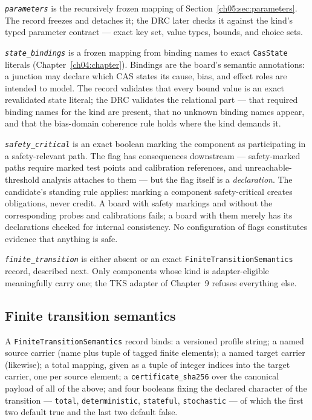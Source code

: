 \emph{\texttt{parameters}} is the recursively frozen mapping of
Section~\ref{ch05:sec:parameters}. The record freezes and detaches it;
the DRC later checks it against the kind's typed parameter contract ---
exact key set, value types, bounds, and choice sets.

\emph{\texttt{state\_bindings}} is a frozen mapping from binding names to
exact \texttt{CasState} literals (Chapter~\ref{ch04:chapter}). Bindings
are the board's semantic annotations: a junction may declare which CAS
states its cause, bias, and effect roles are intended to model. The
record validates that every bound value is an exact revalidated state
literal; the DRC validates the relational part --- that required binding
names for the kind are present, that no unknown binding names appear, and
that the bias-domain coherence rule holds where the kind demands it.

\emph{\texttt{safety\_critical}} is an exact boolean marking the component
as participating in a safety-relevant path. The flag has consequences
downstream --- safety-marked paths require marked test points and
calibration references, and unreachable-threshold analysis attaches to
them --- but the flag itself is a \emph{declaration}. The candidate's
standing rule applies: marking a component safety-critical creates
obligations, never credit. A board with safety markings and without the
corresponding probes and calibrations fails; a board with them merely has
its declarations checked for internal consistency. No configuration of
flags constitutes evidence that anything is safe.

\emph{\texttt{finite\_transition}} is either absent or an exact
\texttt{FiniteTransitionSemantics} record, described next. Only
components whose kind is adapter-eligible meaningfully carry one; the
TKS adapter of Chapter~9 refuses everything else.

\subsection{Finite transition semantics}\label{ch05:sec:finite}

\begin{definition}\label{ch05:def:finite}
A \texttt{FiniteTransitionSemantics} record binds: a versioned profile
string; a named source carrier (name plus tuple of tagged finite
elements); a named target carrier (likewise); a total mapping, given as a
tuple of integer indices into the target carrier, one per source element;
a \texttt{certificate\_sha256} over the canonical payload of all of the
above; and four booleans fixing the declared character of the transition
--- \texttt{total}, \texttt{deterministic}, \texttt{stateful},
\texttt{stochastic} --- of which the first two default true and the last
two default false.
\end{definition}


